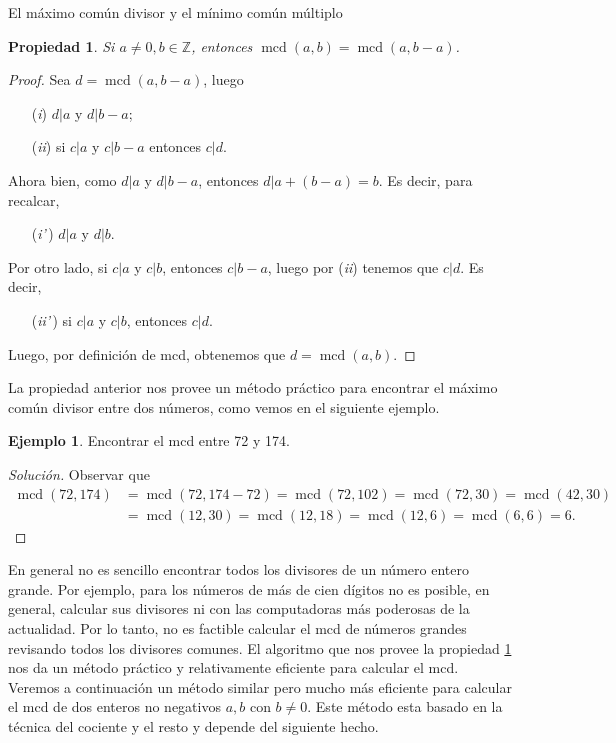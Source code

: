 \documentclass[11pt,spanish,makeidx]{amsbook}
\newtheorem{propiedad}[teorema]{Propiedad}
\theoremstyle{definition}
\newtheorem{ejemplo}{Ejemplo}[section]
\theoremstyle{remark}
\newcommand \mcd{\operatorname{mcd}}
\begin{document}
\begin{section}{El máximo común divisor y el mínimo común múltiplo}
\begin{propiedad}\label{propiedad1}
Si $a \not=0, b \in \mathbb Z$, entonces $\mcd(a,b) = \mcd(a,b-a)$. 
\end{propiedad}
\begin{proof}
	Sea $d =  \mcd(a,b-a)$, luego 
	\begin{enumerate}
		\item[({\em i})] $ d|a$ y $d|b -a$;
		\item[({\em ii})] si $ c|a $ y $c|b -a$ entonces $ c|d$.
	\end{enumerate}
	Ahora bien, como  $ d|a$ y $d|b -a$, entonces $  d|a +(b -a) = b$. Es decir, para recalcar,
	\begin{enumerate}
		\item[({\em i'\,})] $ d|a$ y $d|b$.
	\end{enumerate}
	Por otro lado, si  $ c|a $ y $c|b$, entonces  $c|b -a$, luego por ({\em ii}) tenemos que $c|d$. Es decir, 
	\begin{enumerate}
		\item[({\em ii'\,})] si  $ c|a $ y $c|b$, entonces  $c|d$.
	\end{enumerate}
	Luego, por definición de mcd, obtenemos que $d = \mcd(a,b)$.
\end{proof}

La propiedad anterior nos provee un método práctico para encontrar el máximo común divisor entre dos números, como vemos en el siguiente ejemplo.

\begin{ejemplo} Encontrar el mcd entre 72 y 174.
	\begin{proof}[Solución] Observar que 
		\begin{align*}
		\mcd(72, 174) &= \mcd(72,174-72) = \mcd(72,102) = \mcd(72,30) =  \mcd(42, 30) \\&= \mcd(12,30) = \mcd(12,18)= \mcd(12,6)= \mcd(6,6) = 6.  
		\end{align*}
	\end{proof}
\end{ejemplo} 

En  general no es sencillo encontrar todos los divisores de un número entero grande. Por ejemplo, para los  números de más de cien dígitos no es posible,  en general, calcular sus divisores ni con las computadoras más poderosas de la actualidad. Por  lo tanto, no es factible calcular el  mcd de números grandes revisando todos los divisores comunes.  El algoritmo que nos provee la  propiedad \ref{propiedad1} nos da un método práctico y relativamente eficiente para calcular el mcd. Veremos a continuación un método similar pero mucho más eficiente para calcular el mcd de dos enteros no negativos $a,b$ con $b \not=0$. Este método esta basado en la técnica del cociente y el resto y depende del siguiente hecho.


\end{section}
\end{document}
